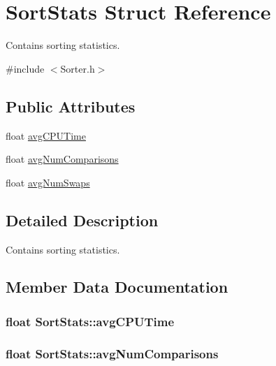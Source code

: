 \hypertarget{struct_sort_stats}{}\section{Sort\+Stats Struct Reference}
\label{struct_sort_stats}


Contains sorting statistics.  




{\ttfamily \#include $<$Sorter.\+h$>$}

\subsection*{Public Attributes}
\begin{DoxyCompactItemize}
\item 
float \hyperlink{struct_sort_stats_a11a7890287500982a8d08d5ea9da2bbb}{avg\+C\+P\+U\+Time}
\item 
float \hyperlink{struct_sort_stats_a7566917dde7a1cfefbe2775c858413c1}{avg\+Num\+Comparisons}
\item 
float \hyperlink{struct_sort_stats_a0ce1570721d9b686f9fa0adb164689df}{avg\+Num\+Swaps}
\end{DoxyCompactItemize}


\subsection{Detailed Description}
Contains sorting statistics. 

\subsection{Member Data Documentation}
\subsubsection[{\texorpdfstring{avg\+C\+P\+U\+Time}{avgCPUTime}}]{\setlength{\rightskip}{0pt plus 5cm}float Sort\+Stats\+::avg\+C\+P\+U\+Time}\hypertarget{struct_sort_stats_a11a7890287500982a8d08d5ea9da2bbb}{}\label{struct_sort_stats_a11a7890287500982a8d08d5ea9da2bbb}
\subsubsection[{\texorpdfstring{avg\+Num\+Comparisons}{avgNumComparisons}}]{\setlength{\rightskip}{0pt plus 5cm}float Sort\+Stats\+::avg\+Num\+Comparisons}\hypertarget{struct_sort_stats_a7566917dde7a1cfefbe2775c858413c1}{}\label{struct_sort_stats_a7566917dde7a1cfefbe2775c858413c1}
